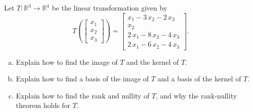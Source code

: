 
\begin{exerciseStatement}
 Let \(T:\mathbb{R}^ 3  \to \mathbb{R}^ 4 \) be the linear transformation given by \[T\left(  \left[\begin{array}{c}
x_{1} \\
x_{2} \\
x_{3}
\end{array}\right]  \right) =  \left[\begin{array}{c}
x_{1} - 3 \, x_{2} - 2 \, x_{3} \\
x_{2} \\
2 \, x_{1} - 8 \, x_{2} - 4 \, x_{3} \\
2 \, x_{1} - 6 \, x_{2} - 4 \, x_{3}
\end{array}\right] .\]
\begin{enumerate}[(a)]
\item Explain how to find the image of \(T\) and the kernel of \(T\).
\item Explain how to find a basis of the image of \(T\) and a basis of the kernel of \(T\).
\item Explain how to find the rank and nullity of \(T\), and why the rank-nullity theorem holds for \(T\).
\end{enumerate}
    
\end{exerciseStatement}
    
